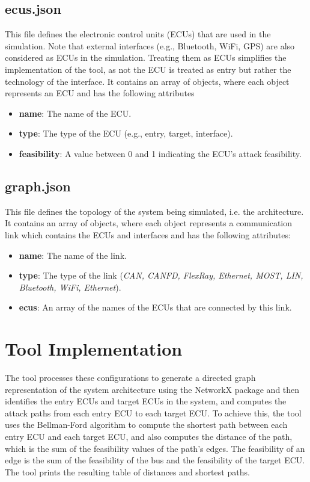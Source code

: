 \subsection{ecus.json}
\label{sec:ecus}

This file defines the electronic control units (ECUs) that are used in the simulation. 
Note that external interfaces (e.g., Bluetooth, WiFi, GPS) are also considered as ECUs in the simulation.
Treating them as ECUs simplifies the implementation of the tool, as not the ECU is treated as entry but rather the technology of the interface.
It contains an array of objects, where each object represents an ECU and has the following attributes

\begin{itemize}
\item \textbf{name}: The name of the ECU.
\item \textbf{type}: The type of the ECU (e.g., entry, target, interface).
\item \textbf{feasibility}: A value between 0 and 1 indicating the ECU's attack feasibility.
\end{itemize}

\subsection{graph.json}
\label{sec:graph}

This file defines the topology of the system being simulated, i.e. the architecture. 
It contains an array of objects, where each object represents a communication link which contains the ECUs and interfaces and has the following attributes:

\begin{itemize}
\item \textbf{name}: The name of the link.
\item \textbf{type}: The type of the link (\textit{CAN, CANFD, FlexRay, Ethernet, MOST, LIN, Bluetooth, WiFi, Ethernet}).
\item \textbf{ecus}: An array of the names of the ECUs that are connected by this link.
\end{itemize}


\section{Tool Implementation}
\label{sec:implementation}

The tool processes these configurations to generate a directed graph representation of the system architecture using the NetworkX package and
then identifies the entry ECUs and target ECUs in the system, and computes the attack paths from each entry ECU to each target ECU. 
To achieve this, the tool uses the Bellman-Ford algorithm to compute the shortest path between each entry ECU and each target ECU, 
and also computes the distance of the path, which is the sum of the feasibility values of the path's edges. 
The feasibility of an edge is the sum of the feasibility of the bus and the feasibility of the target ECU. 
The tool prints the resulting table of distances and shortest paths.\\

